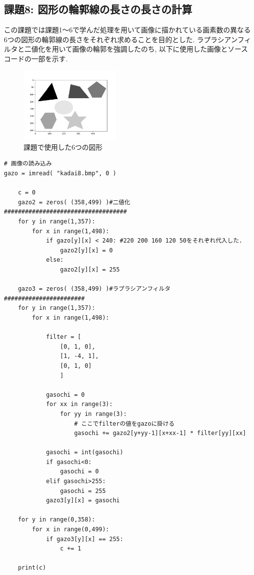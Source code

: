 \documentclass[a4paper,11pt,uplatex, titlepage]{jsarticle}
\begin{document}
\subsection{課題8: 図形の輪郭線の長さの長さの計算}
この課題では課題1〜6で学んだ処理を用いて画像に描かれている画素数の異なる6つの図形の輪郭線の長さをそれぞれ求めることを目的とした.
ラプラシアンフィルタと二値化を用いて画像の輪郭を強調したのち,
以下に使用した画像とソースコードの一部を示す.

\begin{figure}[H]
    \begin{center}
      \includegraphics[width = 5cm]{pic/kadai8_1.png}
      \caption{課題で使用した6つの図形}
      \label{8}
      \end{center}
\end{figure}

\begin{lstlisting}[basicstyle=\ttfamily\footnotesize]
# 画像の読み込み
gazo = imread( "kadai8.bmp", 0 )

    c = 0
    gazo2 = zeros( (358,499) )#二値化###################################
    for y in range(1,357):
        for x in range(1,498):
            if gazo[y][x] < 240: #220 200 160 120 50をそれぞれ代入した.
                gazo2[y][x] = 0
            else:
                gazo2[y][x] = 255

    gazo3 = zeros( (358,499) )#ラプラシアンフィルタ#######################
    for y in range(1,357):
        for x in range(1,498):

            filter = [
                [0, 1, 0],
                [1, -4, 1],
                [0, 1, 0]
                ]

            gasochi = 0
            for xx in range(3):
                for yy in range(3):
                    # ここでfilterの値をgazoに掛ける
                    gasochi += gazo2[y+yy-1][x+xx-1] * filter[yy][xx]

            gasochi = int(gasochi)
            if gasochi<0:
                gasochi = 0
            elif gasochi>255:
                gasochi = 255
            gazo3[y][x] = gasochi

    for y in range(0,358):
        for x in range(0,499):
            if gazo3[y][x] == 255:
                c += 1

    print(c)
\end{lstlisting}
\end{document}
